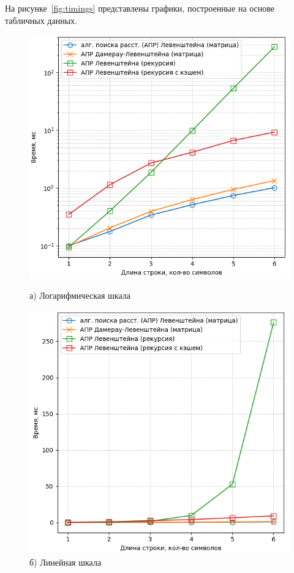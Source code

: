На рисунке~\ref{fig:timings} представлены графики, построенные на основе табличных данных.

\begin{figure}[!htb]
    \centering
    \begin{minipage}[t]{0.55\textwidth}
        \centering
        \includegraphics[width=\linewidth]{img/logarithmic.png}
        \caption*{а) Логарифмическая шкала}
    \end{minipage}

    \vspace{1em}

    \begin{minipage}[t]{0.55\textwidth}
        \centering
        \includegraphics[width=\linewidth]{img/default.png}
        \caption*{б) Линейная шкала}
    \end{minipage}


\end{figure}
